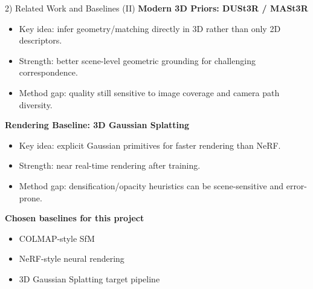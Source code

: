 \documentclass[aspectratio=169]{beamer}
\begin{document}
\begin{frame}{2) Related Work and Baselines (II)}
\textbf{Modern 3D Priors: DUSt3R / MASt3R}
\begin{itemize}
  \item Key idea: infer geometry/matching directly in 3D rather than only 2D descriptors.
  \item Strength: better scene-level geometric grounding for challenging correspondence.
  \item Method gap: quality still sensitive to image coverage and camera path diversity.
\end{itemize}

\vspace{0.5em}
\textbf{Rendering Baseline: 3D Gaussian Splatting}
\begin{itemize}
  \item Key idea: explicit Gaussian primitives for faster rendering than NeRF.
  \item Strength: near real-time rendering after training.
  \item Method gap: densification/opacity heuristics can be scene-sensitive and error-prone.
\end{itemize}

\vspace{0.5em}
\textbf{Chosen baselines for this project}
\begin{itemize}
  \item COLMAP-style SfM
  \item NeRF-style neural rendering
  \item 3D Gaussian Splatting target pipeline
\end{itemize}
\end{frame}
\end{document}
